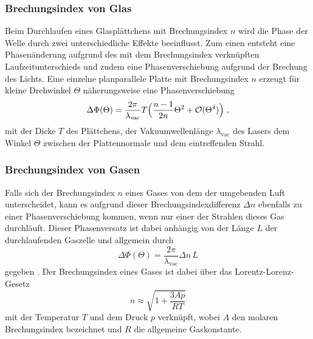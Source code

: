 \subsubsection{Brechungsindex von Glas}
Beim Durchlaufen eines Glasplättchens mit Brechungsindex $n$ wird die Phase der Welle durch zwei
unterschiedliche Effekte beeinflusst. Zum einen entsteht eine Phasenänderung aufgrund
des mit dem Brechungsindex verknüpften Laufzeitunterschieds und zudem eine
Phasenverschiebung aufgrund der Brechung des Lichts. Eine einzelne planparallele Platte
mit Brechungsindex $n$ erzeugt für kleine Drehwinkel $\Theta$  näherungsweise eine Phasenverschiebung \cite{skript}
\begin{equation}
\Delta \Phi
(\Theta)=\frac{2\pi}{\lambda_{\text{vac}}}T\Bigl(\frac{n-1}{2n}\Theta^2+\mathcal{O}(\Theta^4)   \Bigr) \; ,
\label{eqn:pM0}
\end{equation}
mit der Dicke $T$ des Plättchens, der Vakuumwellenlänge $\lambda_{\text{vac}}$ des Lasers dem Winkel $\Theta$
zwischen der Plattennormale und dem eintreffenden Strahl.

\subsubsection{Brechungsindex von Gasen}
Falls sich der Brechungsindex $n$ eines Gases von dem der umgebenden Luft unterscheidet, kann es
aufgrund dieser Brechungsindexdifferenz $\Delta n$ ebenfalls zu einer Phasenverschiebung
kommen, wenn nur einer der Strahlen dieses Gas durchläuft.
Dieser Phasenversatz ist dabei anhängig von der Länge $L$
der durchlaufenden Gaszelle und allgemein durch
\begin{equation}
\Delta \Phi(\Theta)=\frac{2\pi}{\lambda_{\text{vac}}} \Delta n\,L
\label{eqn:pM2}
\end{equation}
gegeben \cite{skript}. Der Brechungsindex eines Gases ist dabei über das Lorentz-Lorenz-Gesetz
\begin{equation}
  n \approx \sqrt{1+ \frac{3Ap}{RT}}
  \label{eqn:lorentz}
\end{equation}
mit der Temperatur $T$ und dem Druck $p$ verknüpft, wobei $A$ den molaren Brechungsindex
bezeichnet und $R$ die allgemeine Gaskonstante.
